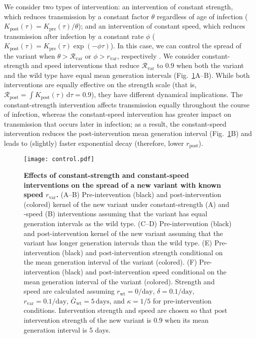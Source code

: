 \documentclass[12pt]{article}
\newcommand{\fref}[1]{Fig.~\ref{fig:#1}}
\newcommand{\vvvar}{\mathrm{var}}
\newcommand{\wwwt}{\mathrm{wt}}
\newcommand{\rx}[1]{\ensuremath{{r}_{#1}}\xspace}
\newcommand{\ry}[1]{\rx{\mathrm{#1}}}
\newcommand{\rw}{\rx{\wwwt}}
\newcommand{\rv}{\rx{\vvvar}}
\newcommand{\Rx}[1]{\ensuremath{{\mathcal R}_{#1}}\xspace}
\newcommand{\Ry}[1]{\Rx{\mathrm{#1}}}
\newcommand{\Rv}{\Rx{\vvvar}}
\newcommand{\pday}{\ensuremath{/\textrm{day}}}
\newcommand{\dd}[1]{\ensuremath{\, \mathrm{d}#1}}
\newcommand{\dtau}{\dd{\tau}}
\newcommand{\Gx}[1]{\ensuremath{{\bar G}_{#1}}\xspace}
\newcommand{\Gy}[1]{\Gx{\mathrm{#1}}}
\begin{document}
We consider two types of intervention:
an intervention of constant strength, which reduces transmission by a constant factor $\theta$ regardless of age of infection ($K_{\mathrm{post}}(\tau) = K_{\mathrm{pre}}(\tau)/\theta$); and an intervention of constant speed, which reduces transmission after infection by a constant rate $\phi$ ($K_{\mathrm{post}}(\tau) = K_{\mathrm{pre}}(\tau) \exp(-\phi \tau)$).
In this case, we can control the spread of the variant when $\theta > \Rv$ or $\phi > \rv$, respectively \citep{doi:10.1098/rspb.2020.1556}.
We consider constant-strength and speed interventions that reduce $\Rv$ to 0.9 when both the variant and the wild type have equal mean generation intervals (\fref{strengthspeed}A--B).
While both interventions are equally effective on the strength scale (that is, $\Ry{post}=\int  K_{\mathrm{post}}(\tau) \dtau = 0.9$), they have different dynamical implications.
The constant-strength intervention affects transmission equally throughout the course of infection, whereas the constant-speed intervention has greater impact on transmission that occurs later in infection;
as a result, the constant-speed intervention reduces the post-intervention mean generation interval (\fref{strengthspeed}B) and leads to (slightly) faster exponential decay (therefore, lower $\ry{post}$).

\begin{figure}[!th]
\texttt{[image: control.pdf]}
\caption{
\textbf{Effects of constant-strength and constant-speed interventions on the spread of a new variant with known speed \rv.}
(A--B) Pre-intervention (black) and post-intervention (colored) kernel of the new variant under constant-strength (A) and -speed (B) interventions assuming that the variant has equal generation intervals as the wild type.
(C--D) Pre-intervention (black) and post-intervention kernel of the new variant assuming that the variant has longer generation intervals than the wild type.
(E) Pre-intervention (black) and post-intervention strength conditional on the mean generation interval of the variant (colored).
(F) Pre-intervention (black) and post-intervention speed conditional on the mean generation interval of the variant (colored).
Strength and speed are calculated assuming $\rw=0\pday$, $\delta=0.1\pday$, $\rv=0.1\pday$, $\Gy{wt}=5\,\textrm{days}$, and $\kappa=1/5$ for pre-intervention conditions.
Intervention strength and speed are chosen so that post intervention strength of the new variant is 0.9 when its mean generation interval is 5 days.
}
\label{fig:strengthspeed}
\end{figure}
\end{document}
